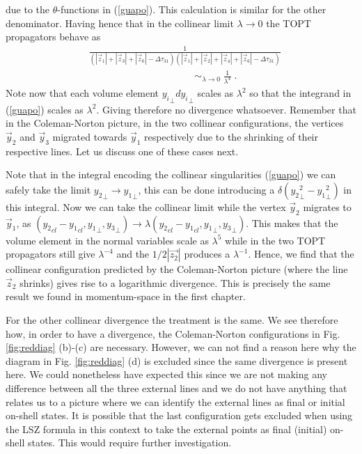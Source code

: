 \documentclass[%
 reprint,
 amsmath,amssymb,
 aps,
]{revtex4-1}
\begin{document}
due to the $\theta$-functions in (\ref{guapo}). This calculation is similar for the other denominator. Having hence that in the collinear limit $\lambda\to0$ the TOPT propagators behave as
\begin{align}
&\frac{1}{(|\vec{z}_1|+|\vec{z}_3|+|\vec{z}_6|-\Delta\tau_{31}) (|\vec{z}_1|+|\vec{z}_2|+|\vec{z}_4|+|\vec{z}_6|-\Delta\tau_{31})}\nonumber\\
&\;\;\;\;\;\;\;\;\;\;\;\;\;\;\;\;\;\;\;\;\;\;\;\;\;\;\;\;\;\;\;\;\;\;\;\;\;\;\;{\sim}_{\lambda\to0}\;\frac{1}{\lambda^4}\;.
\end{align}
Note now that each volume element ${y_i}_\perp d {y_i}_\perp$ scales as $\lambda^2$ so that the integrand in (\ref{guapo}) scales as $\lambda^2$. Giving therefore no divergence whatsoever. Remember that in the Coleman-Norton picture, in the two collinear configurations, the vertices $\vec{y}_2$ and $\vec{y}_3$ migrated towards $\vec{y}_1$ respectively due to the shrinking of their respective lines. Let us discuss one of these cases next.\par
Note that in the integral encoding the collinear singularities (\ref{guapo}) we can safely take the limit ${y_2}_\perp\to{y_1}_\perp$, this can be done introducing a $\delta({y_2}_\perp^2-{y_1}_\perp^2)$ in this integral. Now we can take the collinear limit while the vertex $\vec{y}_2$ migrates to $\vec{y}_1$, as $({y_2}_{cl}-{y_1}_{cl},{y_1}_\perp,{y_3}_\perp)\to \lambda({y_2}_{cl}-{y_1}_{cl},{y_1}_\perp,{y_3}_\perp)$. This makes that the volume element in the normal variables scale as $\lambda^5$ while in the two TOPT propagators still give $\lambda^{-4}$ and the $1/2|\vec{z_2}|$ produces a $\lambda^{-1}$. Hence, we find that the collinear configuration predicted by the Coleman-Norton picture (where the line $\vec{z}_2$ shrinks) gives rise to a logarithmic divergence. This is precisely the same result we found in momentum-space in the first chapter.\par
For the other collinear divergence the treatment is the same. We see therefore how, in order to have a divergence, the Coleman-Norton configurations in Fig. \ref{fig:reddiag} (b)-(c) are necessary. However, we can not find a reason here why the diagram in Fig. \ref{fig:reddiag} (d) is excluded since the same divergence is present here. We could nonetheless have expected this since we are not making any difference between all the three external lines and we do not have anything that relates us to a picture where we can identify the external lines as final or initial on-shell states. It is possible that the last configuration gets excluded when using the LSZ formula in this context to take the external points as final (initial) on-shell states. This would require further investigation.\par
\end{document}
